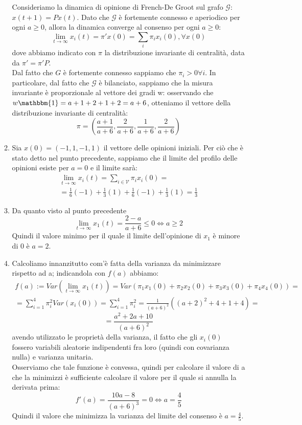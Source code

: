 \documentclass[11pt,largemargins]{homework}
\begin{document}
\begin{enumerate}[label=(\alph*)]
\begin{enumerate}[label=(\alph*)]
Consideriamo la dinamica di opinione di French-De Groot sul grafo $\mathcal{G}$: $x(t+1)=Px(t)$.
Dato che $\mathcal{G}$ è fortemente connesso e aperiodico per ogni $a\geq0$, allora la dinamica converge al consenso per ogni $a\geq0$: \[\lim_{t \to \infty}x_i(t)=\pi ' x(0)= \sum_i 	\pi_i x_i(0), \forall x(0)\] dove abbiamo indicato con $\pi$ la distribuzione invariante di cent\-ra\-li\-tà, data da $\pi'=\pi'P$.\\
Dal fatto che $G$ è fortemente connesso sappiamo che $\pi_i>0 \forall i$. In particolare, dal fatto che $\mathcal{G}$ è bilanciato, sappiamo che la misura invariante è proporzionale al vettore dei gradi w: osservando che $w\mathbbm{1}=a+1+2+1+2=a+6$, otteniamo il vettore della distribuzione invariante di centralità:
\[\pi=(\frac{a+1}{a+6}, \frac{2}{a+6},\frac{1}{a+6},\frac{2}{a+6})\]

\item %
Sia $x(0)=(-1,1,-1,1)$ il vettore delle opinioni iniziali. Per ciò che è stato detto nel punto precedente, sappiamo che il limite del profilo delle opinioni esiste per $a=0$ e il limite sarà: 
\begin{multline*}\lim_{t \to \infty}x_i(t)=\sum_{i \in \mathcal{V}}\pi_ix_i(0)=\\ = \frac{1}{6}(-1)+ \frac{1}{3}(1)+\frac{1}{6}(-1)+\frac{1}{3}(1)=\frac{1}{3}\end{multline*}

\item  %
Da quanto visto al punto precedente \[\lim_{t \to \infty}x_1(t)=\frac{2-a}{a+6}\leq0 \Leftrightarrow a\geq 2\]
Quindi il valore minimo per il quale il limite dell'opinione di $x_1$ è minore di 0 è $a=2$.

\item %
Calcoliamo innanzitutto com'è fatta della varianza da minimizzare rispetto ad a; indicandola con $f(a)$ abbiamo: 
\begin{multline*}f(a):=Var(\lim_{t \to \infty}x_1(t)) = Var( \pi_1x_1(0)+\pi_2x_2(0)+\pi_3x_3(0)+\pi_4x_4(0))=\\ =\sum_{i=1}^4\pi^2_i Var(x_i(0)) = \sum_{i=1}^4\pi_i^2
=\frac{1}{(a+6)^2}((a+2)^2+4+1+4)=\end{multline*}
\[=\frac{a^2+2a+10}{(a+6)^2}\]
avendo utilizzato le proprietà della varianza, il fatto che gli $x_i(0)$ fossero variabili aleatorie indipendenti fra loro (quindi con co\-va\-rian\-za nulla) e varianza unitaria.\\
Osserviamo che tale funzione è convessa, quindi per calcolare il valore di a che la minimizzi è sufficiente calcolare il valore per il quale si annulla la derivata prima:
\[f'(a)=\frac{10a-8}{(a+6)^3}=0 \Leftrightarrow a=\frac{4}{5}\]
Quindi il valore che minimizza la varianza del limite del consenso è $a=\frac{4}{5}$.
\end{enumerate}



\end{enumerate}
\end{document}
